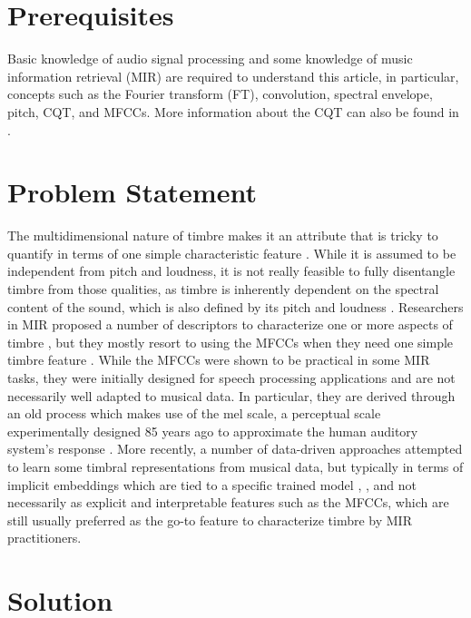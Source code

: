 \documentclass[journal]{IEEEtran}
\begin{document}
\section{Prerequisites}

Basic knowledge of audio signal processing and some knowledge of music information retrieval (MIR) \cite{mueller2007} are required to understand this article, in particular, concepts such as the Fourier transform (FT), convolution, spectral envelope, pitch, CQT, and MFCCs. More information about the CQT can also be found in \cite{brown1991, brown1992}.


\section{Problem Statement}

The multidimensional nature of timbre makes it an attribute that is tricky to quantify in terms of one simple characteristic feature \cite{grey1977}. While it is assumed to be independent from pitch and loudness, it is not really feasible to fully disentangle timbre from those qualities, as timbre is inherently dependent on the spectral content of the sound, which is also defined by its pitch and loudness \cite{moore2004}. Researchers in MIR proposed a number of descriptors to characterize one or more aspects of timbre \cite{peeters2011}, but they mostly resort to using the MFCCs when they need one simple timbre feature \cite{mueller2007}. While the MFCCs were shown to be practical in some MIR tasks, they were initially designed for speech processing applications \cite{mermelstein1976} and are not necessarily well adapted to musical data. In particular, they are derived through an old process which makes use of the mel scale, a perceptual scale experimentally designed 85 years ago to approximate the human auditory system's response \cite{stevens1937}. More recently, a number of data-driven approaches attempted to learn some timbral representations from musical data, but typically in terms of implicit embeddings which are tied to a specific trained model \cite{engel2017}, \cite{pons2017}, and not necessarily as explicit and interpretable features such as the MFCCs, which are still usually preferred as the go-to feature to characterize timbre by MIR practitioners.


\section{Solution}
\end{document}
